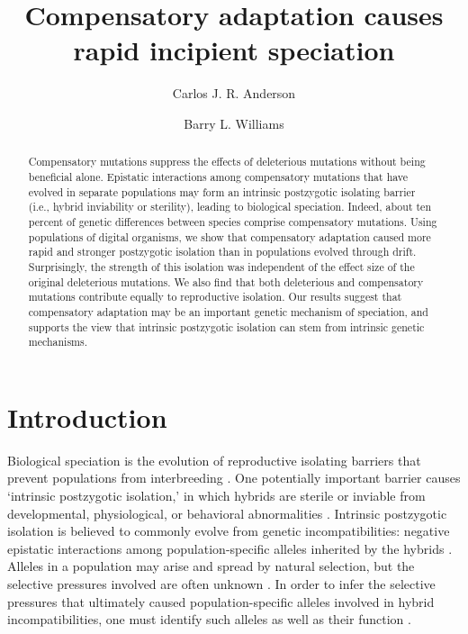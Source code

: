 \documentclass[12pt]{article}
\title{Compensatory adaptation causes rapid incipient speciation}
\author{Carlos J. R. Anderson \and Barry L. Williams}
\begin{document}
\maketitle

\begin{abstract}
Compensatory mutations suppress the effects of deleterious mutations
without being beneficial alone.
%
Epistatic interactions among compensatory mutations that have
evolved in separate populations may form an intrinsic
postzygotic isolating barrier (i.e., hybrid inviability or sterility),
leading to biological speciation.
%
Indeed, about ten percent of genetic differences between species
comprise compensatory mutations.
%
Using populations of digital organisms, we show that
compensatory adaptation caused more rapid and stronger
postzygotic isolation than in
populations evolved through drift.
%
Surprisingly, the strength of this isolation was independent
of the effect size of the original deleterious mutations.
%
We also find that
both deleterious and compensatory mutations
contribute equally to reproductive isolation.
%
Our results suggest that compensatory adaptation may be
an important genetic mechanism of speciation,
and supports the view that intrinsic postzygotic isolation
can stem from intrinsic genetic mechanisms.
\end{abstract}



\section*{Introduction}

Biological speciation is the evolution of reproductive isolating
barriers that prevent populations from interbreeding \cite{coy04}.
%
One potentially important barrier causes `intrinsic postzygotic isolation,'
in which hybrids are sterile or inviable from developmental, physiological,
or behavioral abnormalities \cite{coy04}.
%
Intrinsic postzygotic isolation is believed to commonly evolve
from genetic incompatibilities: negative epistatic interactions
among population-specific alleles inherited by the hybrids \cite{pre10}.
%
Alleles in a population may arise and spread by natural selection,
but the selective pressures involved are often unknown \cite{sch09}.
%
In order to infer the selective pressures that ultimately caused
population-specific alleles involved in hybrid incompatibilities,
one must identify such alleles as well as their function
\cite{sch09,pre10,nos11}.

\end{document}
